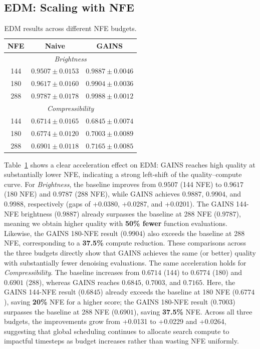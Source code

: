 \subsection{EDM: Scaling with NFE}
\label{sec:exp-edm-scaling}
\begin{table}[t]
\centering
\caption{EDM results across different NFE budgets.}
\label{tab:edm_budget}
\begin{tabular}{c|c|c}
\toprule
\textbf{NFE} & \textbf{Naive} & \textbf{GAINS} \\
\midrule
\multicolumn{3}{c}{\textit{Brightness}} \\
\midrule
144 & $0.9507 \pm 0.0153$ & $0.9887 \pm 0.0046$ \\
180 & $0.9617 \pm 0.0160$ & $0.9904 \pm 0.0036$ \\
288 & $0.9787 \pm 0.0178$ & $0.9988 \pm 0.0012$ \\
\midrule
\multicolumn{3}{c}{\textit{Compressibility}} \\
\midrule
144 & $0.6714 \pm 0.0165$ & $0.6845 \pm 0.0074$ \\
180 & $0.6774 \pm 0.0120$ & $0.7003 \pm 0.0089$ \\
288 & $0.6901 \pm 0.0118$ & $0.7165 \pm 0.0085$ \\
\bottomrule
\end{tabular}
\end{table}
Table~\ref{tab:edm_budget} shows a clear acceleration effect on EDM:
GAINS reaches high quality at substantially lower NFE, indicating a strong
left-shift of the quality--compute curve.
For \textit{Brightness}, the baseline improves from $0.9507$ (144 NFE) to
$0.9617$ (180 NFE) and $0.9787$ (288 NFE), while GAINS achieves
$0.9887$, $0.9904$, and $0.9988$, respectively (gaps of +0.0380, +0.0287,
and +0.0201).
The GAINS 144-NFE brightness ($0.9887$) already surpasses the baseline at
288 NFE ($0.9787$), meaning we obtain higher quality with \textbf{50\% fewer}
function evaluations.
Likewise, the GAINS 180-NFE result ($0.9904$) also exceeds the baseline at 288 NFE,
corresponding to a \textbf{37.5\%} compute reduction.
These comparisons across the three budgets directly show that GAINS
achieves the same (or better) quality with substantially fewer denoising
evaluations.
The same acceleration holds for \textit{Compressibility}.
The baseline increases from $0.6714$ (144) to $0.6774$ (180) and $0.6901$ (288),
whereas GAINS reaches $0.6845$, $0.7003$, and $0.7165$.
Here, the GAINS 144-NFE result ($0.6845$) already exceeds the baseline at 180 NFE
($0.6774$), saving \textbf{20\%} NFE for a higher score;
the GAINS 180-NFE result ($0.7003$) surpasses the baseline at 288 NFE ($0.6901$),
saving \textbf{37.5\%} NFE.
Across all three budgets, the improvements grow from +0.0131 to +0.0229 and
+0.0264, suggesting that global scheduling continues to allocate search compute
to impactful timesteps as budget increases rather than wasting NFE uniformly.

